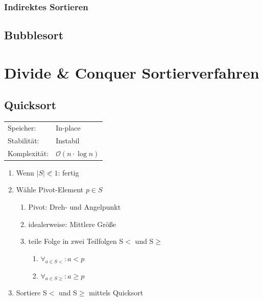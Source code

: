 \documentclass[12pt,a4paper]{article}
\begin{document}
\subsubsection{Indirektes Sortieren}

\subsection{Bubblesort}

\section{Divide \& Conquer Sortierverfahren}
\subsection{Quicksort}
\begin{tabularx}{\textwidth}{l l}
	Speicher: &In-place\\
	Stabilität: &Instabil\\
	Komplexität: &$\mathcal{O}(n \cdot \log n)$\\
\end{tabularx}
\vspace{.8cm}
\newline
\begin{minipage}[c]{0.6\textwidth}
	\begin{enumerate}
		\item Wenn $|S| \eqslantless 1$: fertig
		\item Wähle Pivot-Element $p \in S$
		\begin{enumerate}
			\item Pivot: Dreh- und Angelpunkt
			\item idealerweise: Mittlere Größe
			\item teile Folge in zwei Teilfolgen S$<$ und S$\geqslant $
			\begin{enumerate}
				\item $\forall_{a \in S<}: a<p$
				\item $\forall_{a \in S\geqslant}: a \geqslant p$
			\end{enumerate}
		\end{enumerate}
		\item Sortiere S$<$ und S$\geqslant $ mittels Quicksort
	\end{enumerate}
\end{minipage}
\end{document}
